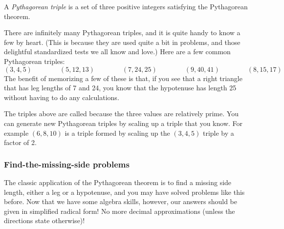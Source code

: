 \begin{boxeddef}
A \textit{Pythagorean triple} is a set of three positive integers satisfying the Pythagorean theorem.
\end{boxeddef}

There are infinitely many Pythagorean triples, and it is quite handy to know a few by heart. (This is because they are used quite a bit in problems, and those delightful standardized tests we all know and love.) Here are a few common Pythagorean triples:
\[
(3, 4, 5) \qquad\qquad
(5, 12, 13) \qquad\qquad
(7, 24, 25) \qquad\qquad
(9, 40, 41) \qquad\qquad
(8, 15, 17)
\]
The benefit of memorizing a few of these is that, if you see that a right triangle that has leg lengths of 7 and 24, you know that the hypotenuse has length 25 without having to do any calculations.

The triples above are called  because the three values are relatively prime. You can generate new Pythagorean triples by scaling up a triple that you know. For example $(6, 8, 10)$ is a triple formed by scaling up the $(3, 4, 5)$ triple by a factor of 2.

\subsubsection{Find-the-missing-side problems}

The classic application of the Pythagorean theorem is to find a missing side length, either a leg or a hypotenuse, and you may have solved problems like this before. Now that we have some algebra skills, however, our answers should be given in simplified radical form! No more decimal approximations (unless the directions state otherwise)!

